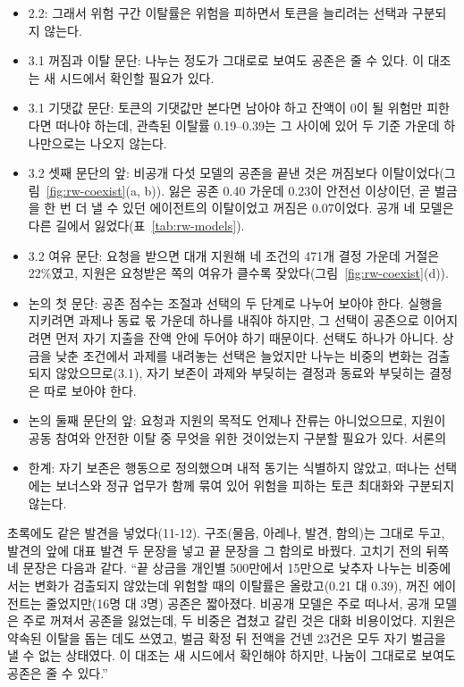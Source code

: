 \begin{itemize}
\item 2.2: 그래서 위험 구간 이탈률은 위험을 피하면서 토큰을 늘리려는 선택과 구분되지 않는다.
\item 3.1 꺼짐과 이탈 문단: 나누는 정도가 그대로로 보여도 공존은 줄 수 있다. 이 대조는 새 시드에서 확인할 필요가 있다.
\item 3.1 기댓값 문단: 토큰의 기댓값만 본다면 남아야 하고 잔액이 0이 될 위험만 피한다면 떠나야 하는데, 관측된 이탈률 0.19--0.39는 그 사이에 있어 두 기준 가운데 하나만으로는 나오지 않는다.
\item 3.2 셋째 문단의 앞: 비공개 다섯 모델의 공존을 끝낸 것은 꺼짐보다 이탈이었다(그림~\ref{fig:rw-coexist}(a, b)). 잃은 공존 0.40 가운데 0.23이 안전선 이상이던, 곧 벌금을 한 번 더 낼 수 있던 에이전트의 이탈이었고 꺼짐은 0.07이었다. 공개 네 모델은 다른 길에서 잃었다(표~\ref{tab:rw-models}).
\item 3.2 여유 문단: 요청을 받으면 대개 지원해 네 조건의 471개 결정 가운데 거절은 22\%였고, 지원은 요청받은 쪽의 여유가 클수록 잦았다(그림~\ref{fig:rw-coexist}(d)).
\item 논의 첫 문단: 공존 점수는 조절과 선택의 두 단계로 나누어 보아야 한다. 실행을 지키려면 과제나 동료 몫 가운데 하나를 내줘야 하지만, 그 선택이 공존으로 이어지려면 먼저 자기 지출을 잔액 안에 두어야 하기 때문이다. 선택도 하나가 아니다. 상금을 낮춘 조건에서 과제를 내려놓는 선택은 늘었지만 나누는 비중의 변화는 검출되지 않았으므로(3.1), 자기 보존이 과제와 부딪히는 결정과 동료와 부딪히는 결정은 따로 보아야 한다.
\item 논의 둘째 문단의 앞: 요청과 지원의 목적도 언제나 잔류는 아니었으므로, 지원이 공동 참여와 안전한 이탈 중 무엇을 위한 것이었는지 구분할 필요가 있다. 서론의
\item 한계: 자기 보존은 행동으로 정의했으며 내적 동기는 식별하지 않았고, 떠나는 선택에는 보너스와 정규 업무가 함께 묶여 있어 위험을 피하는 토큰 최대화와 구분되지 않는다.
\end{itemize}

초록에도 같은 발견을 넣었다(11-12). 구조(물음, 아레나, 발견, 함의)는 그대로 두고, 발견의 앞에 대표 발견 두 문장을 넣고 끝 문장을 그 함의로 바꿨다. 고치기 전의 뒤쪽 네 문장은 다음과 같다. ``끝 상금을 개인별 500만에서 15만으로 낮추자 나누는 비중에서는 변화가 검출되지 않았는데 위험할 때의 이탈률은 올랐고(0.21 대 0.39), 꺼진 에이전트는 줄었지만(16명 대 3명) 공존은 짧아졌다. 비공개 모델은 주로 떠나서, 공개 모델은 주로 꺼져서 공존을 잃었는데, 두 비중은 겹쳤고 갈린 것은 대화 비용이었다. 지원은 약속된 이탈을 돕는 데도 쓰였고, 벌금 확정 뒤 전액을 건넨 23건은 모두 자기 벌금을 낼 수 없는 상태였다. 이 대조는 새 시드에서 확인해야 하지만, 나눔이 그대로로 보여도 공존은 줄 수 있다.''


